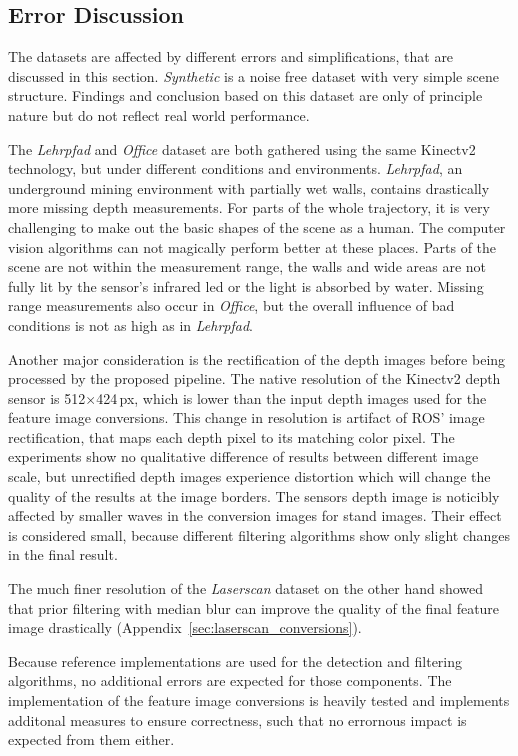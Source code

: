 \subsection{Error Discussion}

The datasets are affected by different errors and simplifications, that are discussed in this section.
\emph{Synthetic} is a noise free dataset with very simple scene structure.
Findings and conclusion based on this dataset are only of principle nature but do not reflect real world performance.

The \emph{Lehrpfad} and \emph{Office} dataset are both gathered using the same Kinectv2 technology, but under different conditions and environments.
\emph{Lehrpfad}, an underground mining environment with partially wet walls, contains drastically more missing depth measurements.
For parts of the whole trajectory, it is very challenging to make out the basic shapes of the scene as a human.
The computer vision algorithms can not magically perform better at these places.
Parts of the scene are not within the measurement range, the walls and wide areas are not fully lit by the sensor's infrared \acrshort{led} or the light is absorbed by water.
Missing range measurements also occur in \emph{Office}, but the overall influence of bad conditions is not as high as in \emph{Lehrpfad}.

Another major consideration is the rectification of the depth images before being processed by the proposed pipeline.
The native resolution of the Kinectv2 depth sensor is 512$\times$424\,px\cite{wasenmuller_accv2016}, which is lower than the input depth images used for the feature image conversions.
This change in resolution is artifact of \acrshort{ROS}' image rectification, that maps each depth pixel to its matching color pixel.
The experiments show no qualitative difference of results between different image scale, but unrectified depth images experience distortion which will change the quality of the results at the image borders.
The sensors depth image is noticibly affected by smaller waves in the conversion images for stand images.
Their effect is considered small, because different filtering algorithms show only slight changes in the final result.

The much finer resolution of the \emph{Laserscan} dataset on the other hand showed that prior filtering with median blur can improve the quality of the final feature image drastically (Appendix~\ref{sec:laserscan_conversions}).

Because reference implementations are used for the detection and filtering algorithms, no additional errors are expected for those components.
The implementation of the feature image conversions is heavily tested and implements additonal measures to ensure correctness, such that no errornous impact is expected from them either.
